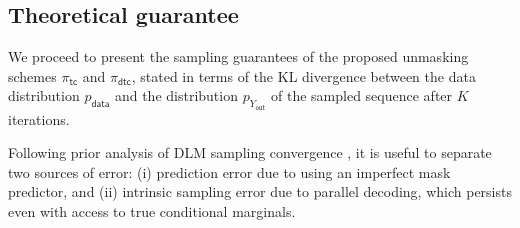 \documentclass[english]{article}
\newcommand{\wh}{\widehat}
\newcommand{\data}{\mathsf{data}}
\newcommand{\tc}{\mathsf{tc}}
\newcommand{\dtc}{\mathsf{dtc}}
\newcommand{\out}{\mathsf{out}}
\begin{document}
\subsection{Theoretical guarantee}

We proceed to present the sampling guarantees of the proposed unmasking schemes $\pi_{\tc}$ and $\pi_{\dtc}$, stated in terms of the KL divergence between the data distribution $p_{\data}$ and the distribution $p_{Y_\out}$ of the sampled sequence after $K$ iterations.


Following prior analysis of DLM sampling convergence \citep{li2025breaking,chen2025optimal}, it is useful to separate 
two sources of error: (i) {prediction error} due to using an imperfect mask predictor, and (ii) {intrinsic sampling error} due to parallel decoding, which persists even with access to true conditional marginals.
\end{document}
